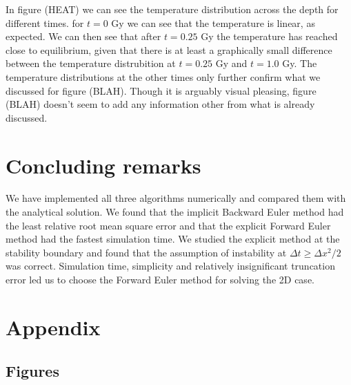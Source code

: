 \documentclass{article}
\begin{document}
\begin{multicols}{2}
In figure (HEAT) we can see the temperature distribution across the depth for different times. for $t=0$ Gy we can see that the temperature is linear, as expected. We can then see that after $t=0.25$ Gy the temperature has reached close to equilibrium, given that there is at least a graphically small difference between the temperature distrubition at $t=0.25$ Gy and $t=1.0$ Gy. The temperature distributions at the other times only further confirm what we discussed for figure (BLAH). Though it is arguably visual pleasing, figure (BLAH) doesn't seem to add any information other from what is already discussed. 

\section{Concluding remarks}

We have implemented all three algorithms numerically and compared them with the analytical solution. We found that the implicit Backward Euler method had the least relative root mean square error and that the explicit Forward Euler method had the fastest simulation time. We studied the explicit method at the stability boundary and found that the assumption of instability at $\Delta t \geq \Delta x^2/2$ was correct. Simulation time, simplicity and relatively insignificant truncation error led us to choose the Forward Euler method for solving the 2D case. 


\end{multicols}

\clearpage

\appendix %

\section{Appendix}

\subsection{Figures}
\end{document}

